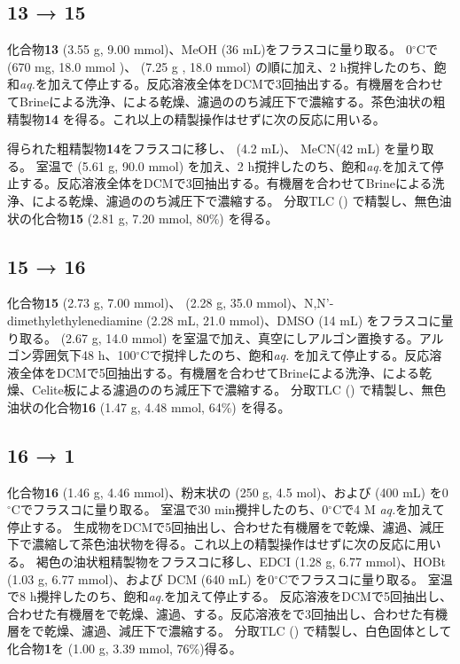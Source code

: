 \documentclass{ltjsarticle}
\theoremstyle{definition}
\numberwithin{equation}{section}
\newcommand{\D}{^\circ\text{C}}
\begin{document}
\subsection{\textbf{13} → \textbf{15}}
化合物\textbf{13}  (3.55  g, 9.00 mmol)、MeOH (36 mL)をフラスコに量り取る。
0$\D$で (670 mg, 18.0 mmol )、 (7.25 g , 18.0 mmol) の順に加え、2 h撹拌したのち、飽和\textit{aq.}を加えて停止する。反応溶液全体をDCMで3回抽出する。有機層を合わせてBrineによる洗浄、による乾燥、濾過ののち減圧下で濃縮する。茶色油状の粗精製物\textbf{14} を得る。これ以上の精製操作はせずに次の反応に用いる。

得られた粗精製物\textbf{14}をフラスコに移し、 (4.2 mL)、 MeCN(42 mL) を量り取る。
室温で (5.61 g, 90.0 mmol) を加え、2 h撹拌したのち、飽和\textit{aq.}を加えて停止する。反応溶液全体をDCMで3回抽出する。有機層を合わせてBrineによる洗浄、による乾燥、濾過ののち減圧下で濃縮する。
分取TLC () で精製し、無色油状の化合物\textbf{15} (2.81 g, 7.20 mmol, 80\%) を得る。

\subsection{\textbf{15} → \textbf{16}}
化合物\textbf{15}  (2.73 g, 7.00 mmol)、 (2.28 g, 35.0 mmol)、N,N’-dimethylethylenediamine (2.28 mL, 21.0 mmol)、DMSO (14 mL) をフラスコに量り取る。
 (2.67 g, 14.0 mmol) を室温で加え、真空にしアルゴン置換する。アルゴン雰囲気下48 h、100$\D$で撹拌したのち、飽和\textit{aq.} を加えて停止する。反応溶液全体をDCMで5回抽出する。有機層を合わせてBrineによる洗浄、による乾燥、Celite板による濾過ののち減圧下で濃縮する。
分取TLC () で精製し、無色油状の化合物\textbf{16} (1.47 g, 4.48 mmol, 64\%) を得る。

\subsection{\textbf{16} → \textbf{1}}
化合物\textbf{16}  (1.46 g, 4.46 mmol)、粉末状の (250 g, 4.5 mol)、および (400 mL) を0$\D$でフラスコに量り取る。
室温で30 min攪拌したのち、0$\D$で4 M \textit{aq.}を加えて停止する。
生成物をDCMで5回抽出し、合わせた有機層をで乾燥、濾過、減圧下で濃縮して茶色油状物を得る。これ以上の精製操作はせずに次の反応に用いる。
褐色の油状粗精製物をフラスコに移し、EDCI (1.28 g, 6.77 mmol)、HOBt (1.03 g, 6.77 mmol)、および DCM (640 mL) を0$\D$でフラスコに量り取る。
室温で8 h攪拌したのち、飽和\textit{aq.}を加えて停止する。
反応溶液をDCMで5回抽出し、合わせた有機層をで乾燥、濾過、する。反応溶液をで3回抽出し、合わせた有機層をで乾燥、濾過、減圧下で濃縮する。
分取TLC () で精製し、白色固体として化合物\textbf{1}を (1.00 g, 3.39 mmol, 76\%)得る。
\end{document}
